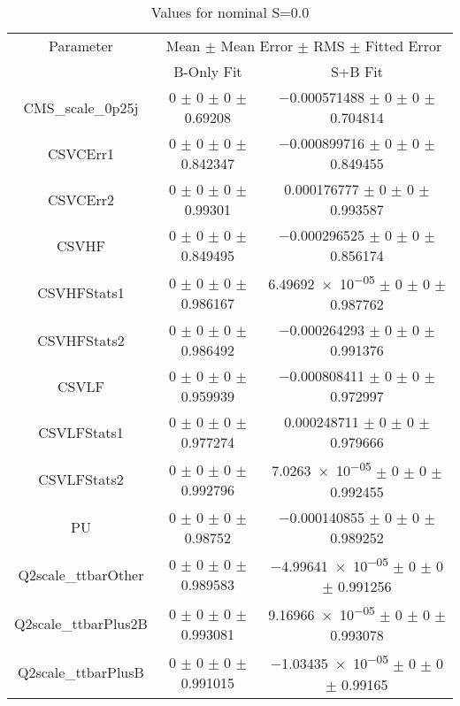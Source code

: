 \begin{table}
\centering
\caption{Values for nominal S=0.0}
\begin{tabular}{ccc}
\toprule
Parameter & \multicolumn{2}{c}{Mean $\pm$ Mean Error $\pm$ RMS $\pm$ Fitted Error}\\
 & B-Only Fit & S+B Fit\\
\midrule
CMS\_scale\_0p25j & \num{0} $\pm$ \num{0} $\pm$ \num{0} $\pm$ \num{0.69208} & \num{-0.000571488} $\pm$ \num{0} $\pm$ \num{0} $\pm$ \num{0.704814}\\
CSVCErr1 & \num{0} $\pm$ \num{0} $\pm$ \num{0} $\pm$ \num{0.842347} & \num{-0.000899716} $\pm$ \num{0} $\pm$ \num{0} $\pm$ \num{0.849455}\\
CSVCErr2 & \num{0} $\pm$ \num{0} $\pm$ \num{0} $\pm$ \num{0.99301} & \num{0.000176777} $\pm$ \num{0} $\pm$ \num{0} $\pm$ \num{0.993587}\\
CSVHF & \num{0} $\pm$ \num{0} $\pm$ \num{0} $\pm$ \num{0.849495} & \num{-0.000296525} $\pm$ \num{0} $\pm$ \num{0} $\pm$ \num{0.856174}\\
CSVHFStats1 & \num{0} $\pm$ \num{0} $\pm$ \num{0} $\pm$ \num{0.986167} & \num{6.49692e-05} $\pm$ \num{0} $\pm$ \num{0} $\pm$ \num{0.987762}\\
CSVHFStats2 & \num{0} $\pm$ \num{0} $\pm$ \num{0} $\pm$ \num{0.986492} & \num{-0.000264293} $\pm$ \num{0} $\pm$ \num{0} $\pm$ \num{0.991376}\\
CSVLF & \num{0} $\pm$ \num{0} $\pm$ \num{0} $\pm$ \num{0.959939} & \num{-0.000808411} $\pm$ \num{0} $\pm$ \num{0} $\pm$ \num{0.972997}\\
CSVLFStats1 & \num{0} $\pm$ \num{0} $\pm$ \num{0} $\pm$ \num{0.977274} & \num{0.000248711} $\pm$ \num{0} $\pm$ \num{0} $\pm$ \num{0.979666}\\
CSVLFStats2 & \num{0} $\pm$ \num{0} $\pm$ \num{0} $\pm$ \num{0.992796} & \num{7.0263e-05} $\pm$ \num{0} $\pm$ \num{0} $\pm$ \num{0.992455}\\
PU & \num{0} $\pm$ \num{0} $\pm$ \num{0} $\pm$ \num{0.98752} & \num{-0.000140855} $\pm$ \num{0} $\pm$ \num{0} $\pm$ \num{0.989252}\\
Q2scale\_ttbarOther & \num{0} $\pm$ \num{0} $\pm$ \num{0} $\pm$ \num{0.989583} & \num{-4.99641e-05} $\pm$ \num{0} $\pm$ \num{0} $\pm$ \num{0.991256}\\
Q2scale\_ttbarPlus2B & \num{0} $\pm$ \num{0} $\pm$ \num{0} $\pm$ \num{0.993081} & \num{9.16966e-05} $\pm$ \num{0} $\pm$ \num{0} $\pm$ \num{0.993078}\\
Q2scale\_ttbarPlusB & \num{0} $\pm$ \num{0} $\pm$ \num{0} $\pm$ \num{0.991015} & \num{-1.03435e-05} $\pm$ \num{0} $\pm$ \num{0} $\pm$ \num{0.99165}\\

\end{tabular}
\end{table}
